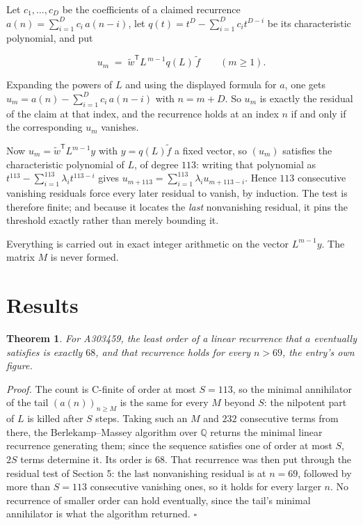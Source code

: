 \documentclass[11pt]{article}
\newtheorem{theorem}{Theorem}
\theoremstyle{definition}
\begin{document}
Let $c_1,\dots,c_D$ be the coefficients of a claimed recurrence $a(n) = \sum_{i=1}^{D} c_i\,a(n-i)$, let $q(t) = t^{D} - \sum_{i=1}^{D} c_i t^{D-i}$ be its characteristic polynomial, and put

\[u_m \;=\; \tilde w^{\mathsf T} L^{\,m-1} q(L)\,\tilde f \qquad (m \ge 1).\]

Expanding the powers of $L$ and using the displayed formula for $a$, one gets $u_m = a(n) - \sum_{i=1}^{D} c_i\,a(n-i)$ with $n = m + D$. So $u_m$ is exactly the residual of the claim at that index, and the recurrence holds at an index $n$ if and only if the corresponding $u_m$ vanishes.

Now $u_m = \tilde w^{\mathsf T} L^{m-1} y$ with $y = q(L)\tilde f$ a fixed vector, so $(u_m)$ satisfies the characteristic polynomial of $L$, of degree $113$: writing that polynomial as $t^{113} - \sum_{i=1}^{113} \lambda_i t^{113-i}$ gives $u_{m+113} = \sum_{i=1}^{113} \lambda_i u_{m+113-i}$. Hence $113$ consecutive vanishing residuals force every later residual to vanish, by induction. The test is therefore finite; and because it locates the {\itshape last} nonvanishing residual, it pins the threshold exactly rather than merely bounding it.

Everything is carried out in exact integer arithmetic on the vector $L^{m-1}y$. The matrix $M$ is never formed.

\section{Results}

\begin{theorem} For A303459, the least order of a linear recurrence that $a$ eventually satisfies is exactly $68$, and that recurrence holds for every $n > 69$, the entry's own figure.\end{theorem}

{\itshape Proof.} The count is C-finite of order at most $S = 113$, so the minimal annihilator of the tail $(a(n))_{n \ge M}$ is the same for every $M$ beyond $S$: the nilpotent part of $L$ is killed after $S$ steps. Taking such an $M$ and $232$ consecutive terms from there, the Berlekamp--Massey algorithm over $\mathbb{Q}$ returns the minimal linear recurrence generating them; since the sequence satisfies one of order at most $S$, $2S$ terms determine it. Its order is $68$. That recurrence was then put through the residual test of Section 5: the last nonvanishing residual is at $n = 69$, followed by more than $S = 113$ consecutive vanishing ones, so it holds for every larger $n$. No recurrence of smaller order can hold eventually, since the tail's minimal annihilator is what the algorithm returned. $\square$
\end{document}
